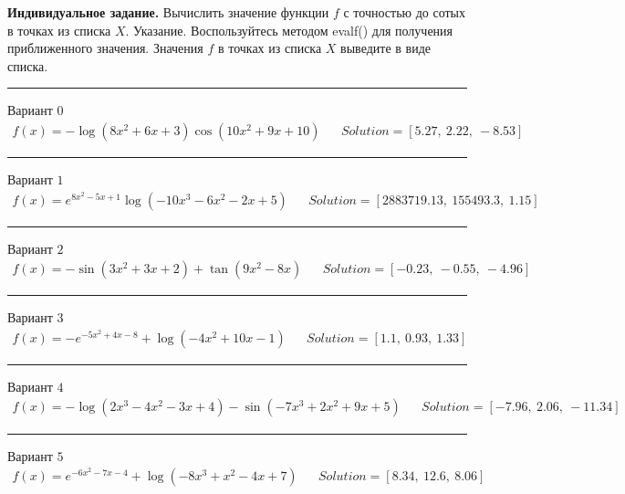 \documentclass[11pt]{report}
\begin{document}
\pagestyle{empty}
{\bf Индивидуальное задание.}
Вычислить значение функции $f$ с точностью до сотых в точках из списка $X$.
Указание. Воспользуйтесь методом evalf() для получения приближенного значения. Значения $f$ в точках из списка $X$ выведите в виде списка.

\begin{center}
    \noindent\rule{8cm}{0.4pt}
\end{center}
Вариант \(0\)
\begin{align*}
    f(x) = - \log{\left(8 x^{2} + 6 x + 3 \right)} \cos{\left(10 x^{2} + 9 x + 10 \right)} && Solution = \left[ 5.27, \  2.22, \  -8.53\right]
\end{align*}
\begin{center}
    \noindent\rule{8cm}{0.4pt}
\end{center}
Вариант \(1\)
\begin{align*}
    f(x) = e^{8 x^{2} - 5 x + 1} \log{\left(- 10 x^{3} - 6 x^{2} - 2 x + 5 \right)} && Solution = \left[ 2883719.13, \  155493.3, \  1.15\right]
\end{align*}
\begin{center}
    \noindent\rule{8cm}{0.4pt}
\end{center}
Вариант \(2\)
\begin{align*}
    f(x) = - \sin{\left(3 x^{2} + 3 x + 2 \right)} + \tan{\left(9 x^{2} - 8 x \right)} && Solution = \left[ -0.23, \  -0.55, \  -4.96\right]
\end{align*}
\begin{center}
    \noindent\rule{8cm}{0.4pt}
\end{center}
Вариант \(3\)
\begin{align*}
    f(x) = - e^{- 5 x^{2} + 4 x - 8} + \log{\left(- 4 x^{2} + 10 x - 1 \right)} && Solution = \left[ 1.1, \  0.93, \  1.33\right]
\end{align*}
\begin{center}
    \noindent\rule{8cm}{0.4pt}
\end{center}
Вариант \(4\)
\begin{align*}
    f(x) = - \log{\left(2 x^{3} - 4 x^{2} - 3 x + 4 \right)} - \sin{\left(- 7 x^{3} + 2 x^{2} + 9 x + 5 \right)} && Solution = \left[ -7.96, \  2.06, \  -11.34\right]
\end{align*}
\begin{center}
    \noindent\rule{8cm}{0.4pt}
\end{center}
Вариант \(5\)
\begin{align*}
    f(x) = e^{- 6 x^{2} - 7 x - 4} + \log{\left(- 8 x^{3} + x^{2} - 4 x + 7 \right)} && Solution = \left[ 8.34, \  12.6, \  8.06\right]
\end{align*}
\end{document}
